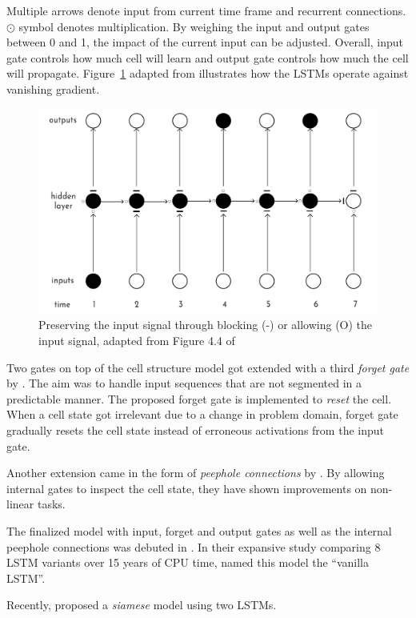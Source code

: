 Multiple arrows denote input from current time frame and recurrent connections.
$\odot$ symbol denotes multiplication.
By weighing the input and output gates between 0 and 1, the impact of the current input can be adjusted.
Overall, input gate controls how much cell will learn and output gate controls how much the cell will propagate.
Figure~\ref{fig:lstm_preserves} adapted from \textcite{graves_long_2012} illustrates how the LSTMs operate against vanishing gradient.

\begin{figure}[htbp]
    \centering
    \includegraphics[page=1,width=\textwidth]{Figures/outputs_hiddenlayer2.pdf}
    \caption{Preserving the input signal through blocking (-) or allowing (O) the input signal, adapted from Figure 4.4 of \textcite{graves_long_2012}}%
    \label{fig:lstm_preserves}
\end{figure}

Two gates on top of the cell structure model got extended with a third \emph{forget gate} by \textcite{gers_learning_2000}.
The aim was to handle input sequences that are not segmented in a predictable manner.
The proposed forget gate is implemented to \emph{reset} the cell.
When a cell state got irrelevant due to a change in problem domain, forget gate gradually resets the cell state instead of erroneous activations from the input gate.

Another extension came in the form of \emph{peephole connections} by \textcite{gers_learning_2003}.
By allowing internal gates to inspect the cell state, they have shown improvements on non-linear tasks.


The finalized model with input, forget and output gates as well as the internal peephole connections was debuted in \textcite{graves_framewise_2005}.
In their expansive study comparing 8 LSTM variants over 15 years of CPU time, \textcite{greff_lstm_2017} named this model the \enquote{vanilla LSTM}.

Recently, \textcite{mueller_siamese_2016} proposed a \emph{siamese} model using two LSTMs.

\textcite{zeiler_adadelta_2012}



